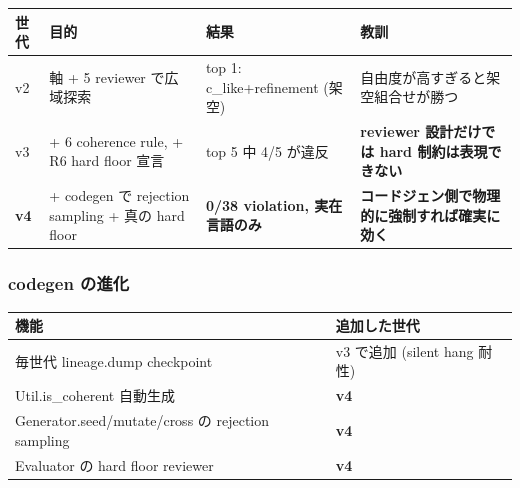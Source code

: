 \documentclass[
]{ltjsarticle}
\newcounter{none} %
\begin{document}
{\def\LTcaptype{none} %
\begin{longtable}[]{@{}
  >{\raggedright\arraybackslash}p{}
  >{\raggedright\arraybackslash}p{}
  >{\raggedright\arraybackslash}p{}
  >{\raggedright\arraybackslash}p{}@{}}
\toprule\noalign{}
\begin{minipage}[b]{\linewidth}\raggedright
世代
\end{minipage} & \begin{minipage}[b]{\linewidth}\raggedright
目的
\end{minipage} & \begin{minipage}[b]{\linewidth}\raggedright
結果
\end{minipage} & \begin{minipage}[b]{\linewidth}\raggedright
教訓
\end{minipage} \\
\midrule\noalign{}
\endhead
\bottomrule\noalign{}
\endlastfoot
v2 & 12 軸 + 5 reviewer で広域探索 & top 1: c\_like+refinement (架空) &
自由度が高すぎると架空組合せが勝つ \\
v3 & + 6 coherence rule, + R6 hard floor 宣言 & top 5 中 4/5 が違反 &
\textbf{reviewer 設計だけでは hard 制約は表現できない} \\
\textbf{v4} & + codegen で rejection sampling + 真の hard floor &
\textbf{0/38 violation, 実在言語のみ} &
\textbf{コードジェン側で物理的に強制すれば確実に効く} \\
\end{longtable}
}

\subsubsection{codegen の進化}\label{codegen-ux306eux9032ux5316}

{\def\LTcaptype{none} %
\begin{longtable}[]{@{}ll@{}}
\toprule\noalign{}
機能 & 追加した世代 \\
\midrule\noalign{}
\endhead
\bottomrule\noalign{}
\endlastfoot
毎世代 lineage.dump checkpoint & v3 で追加 (silent hang 耐性) \\
Util.is\_coherent 自動生成 & \textbf{v4} \\
Generator.seed/mutate/cross の rejection sampling & \textbf{v4} \\
Evaluator の hard floor reviewer & \textbf{v4} \\
\end{longtable}
}
\end{document}
